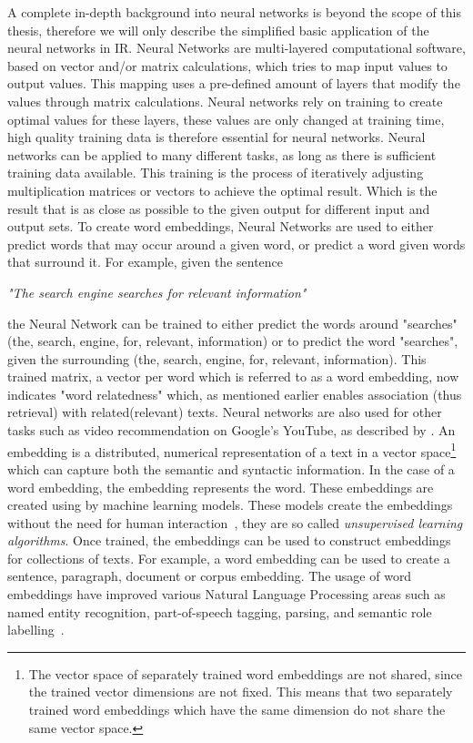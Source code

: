 \documentclass[../../Thesis.tex]{subfiles}
\begin{document}
A complete in-depth background into neural networks is beyond the scope of this thesis, therefore we will only describe the simplified basic application of the neural networks in IR.
Neural Networks are multi-layered computational software, based on vector and/or matrix calculations, which tries to map input values to output values. This mapping uses a pre-defined amount of layers that modify the values through matrix calculations. Neural networks rely on training to create optimal values for these layers, these values are only changed at training time, high quality training data is therefore essential for neural networks. Neural networks can be applied to many different tasks, as long as there is sufficient training data available. This training is the process of iteratively adjusting multiplication matrices or vectors to achieve the optimal result. Which is the result that is as close as possible to the given output for different input and output sets. To create word embeddings, Neural Networks are used to either predict words that may occur around a given word, or predict a word given words that surround it. For example, given the sentence\\
\begin{center}
\textit{"The search engine searches for relevant information"}
\end{center}
the Neural Network can be trained to either predict the words around "searches" (the, search, engine, for, relevant, information) or to predict the word "searches", given the surrounding (the, search, engine, for, relevant, information). This trained matrix, a vector per word which is referred to as a word embedding, now indicates "word relatedness" which, as mentioned earlier enables association (thus retrieval) with related(relevant) texts. Neural networks are also used for other tasks such as video recommendation on Google's YouTube, as described by \citet{covington2016deep}.
An embedding is a distributed, numerical representation of a text in a vector space\footnote{The vector space of separately trained word embeddings are not shared, since the trained vector dimensions are not fixed. This means that two separately trained word embeddings which have the same dimension do not share the same vector space.} which can capture both the semantic and syntactic information\cite{mikolov2013distributed}. In the case of a word embedding, the embedding represents the word. These embeddings are created using by machine learning models. These models create the embeddings without the need for human interaction~\cite{lai2016generate}, they are so called \textit{unsupervised learning algorithms}. Once trained, the embeddings can be used to construct embeddings for collections of texts. For example, a word embedding can be used to create a sentence, paragraph, document or corpus embedding. The usage of word embeddings have improved various Natural Language Processing areas such as named entity recognition, part-of-speech tagging, parsing, and semantic role labelling~\citet{luong2013better}.
\end{document}
